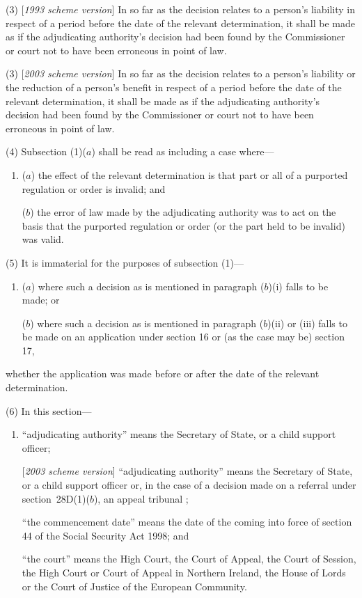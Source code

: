 \documentclass[12pt,a4paper]{article}
\begin{document}
(3) [\emph{1993 scheme version}] In so far as the decision relates to a person’s liability in respect of a period before the date of the relevant determination, it shall be made as if the adjudicating authority’s decision had been found by the Commissioner or court not to have been erroneous in point of law.

(3) [\emph{2003 scheme version}] In so far as the decision relates to a person’s liability 
or the reduction of a person’s benefit  %
in respect of a period before the date of the relevant determination, it shall be made as if the adjudicating authority’s decision had been found by the Commissioner or court not to have been erroneous in point of law.

(4) Subsection (1)($a$) shall be read as including a case where—
\begin{enumerate}\item[]
($a$) the effect of the relevant determination is that part or all of a purported regulation or order is invalid; and

($b$) the error of law made by the adjudicating authority was to act on the basis that the purported regulation or order (or the part held to be invalid) was valid.
\end{enumerate}

(5) It is immaterial for the purposes of subsection (1)—
\begin{enumerate}\item[]
($a$) where such a decision as is mentioned in paragraph ($b$)(i) falls to be made; or

($b$) where such a decision as is mentioned in paragraph ($b$)(ii) or (iii) falls to be made on an application under section 16 or (as the case may be) section 17,
\end{enumerate}
whether the application was made before or after the date of the relevant determination.

(6) In this section—
\begin{enumerate}\item[]
    [\emph{1993 scheme version}] “adjudicating authority” means the Secretary of State, or a child support officer;

    [\emph{2003 scheme version}] “adjudicating authority” means the Secretary of State, or a child support officer
or, in the case of a decision made on a referral under section~28D(1)($b$), an appeal tribunal%
;

    “the commencement date” means the date of the coming into force of section 44 of the Social Security Act 1998; and

    “the court” means the High Court, the Court of Appeal, the Court of Session, the High Court or Court of Appeal in Northern Ireland, the House of Lords or the Court of Justice of the European Community. 
\end{enumerate}
\end{document}
